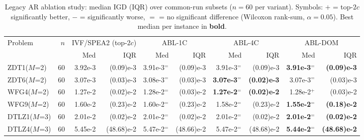 \begin{table}[t]
	\caption{Legacy AR ablation study: median IGD (IQR) over common-run subsets ($n=60$ per variant). Symbols: $+$ = top-$2c$ significantly better, $-$ = significantly worse, $=$ = no significant difference (Wilcoxon rank-sum, $\alpha=0.05$). Best median per instance in \textbf{bold}.}\label{tab:ablation}
	\centering\scriptsize
	\setlength{\tabcolsep}{3pt}
	\begin{tabular}{lrrrrrrrrr}
		\toprule
		Problem      & $n$ & \multicolumn{2}{c}{IVF/SPEA2 (top-$2c$)} & \multicolumn{2}{c}{ABL-1C} & \multicolumn{2}{c}{ABL-4C} & \multicolumn{2}{c}{ABL-DOM}                                                                                              \\
		             &     & Med                                      & IQR                        & Med                        & IQR                         & Med                    & IQR                & Med                    & IQR                 \\
		\midrule
		ZDT1($M$=2)  & 60  & 3.92e-3                                  & (0.09)e-3                  & 3.91e-3$^{=}$              & (0.09)e-3                   & 3.91e-3$^{=}$          & (0.09)e-3          & \textbf{3.91e-3$^{=}$} & \textbf{(0.09)e-3}  \\
		ZDT6($M$=2)  & 60  & 3.07e-3                                  & (0.03)e-3                  & 3.08e-3$^{=}$              & (0.03)e-3                   & \textbf{3.07e-3$^{=}$} & \textbf{(0.02)e-3} & 3.07e-3$^{=}$          & (0.03)e-3           \\
		WFG4($M$=2)  & 60  & 1.27e-2                                  & (0.02)e-2                  & 1.28e-2$^{=}$              & (0.03)e-2                   & \textbf{1.27e-2$^{=}$} & \textbf{(0.02)e-2} & 1.28e-2$^{+}$          & (0.03)e-2           \\
		WFG9($M$=2)  & 60  & 1.60e-2                                  & (0.23)e-2                  & 1.60e-2$^{=}$              & (0.23)e-2                   & 1.58e-2$^{=}$          & (0.23)e-2          & \textbf{1.55e-2$^{=}$} & \textbf{(0.18)e-2}  \\
		DTLZ1($M$=3) & 60  & 2.01e-2                                  & (0.02)e-2                  & 2.01e-2$^{=}$              & (0.02)e-2                   & 2.01e-2$^{=}$          & (0.02)e-2          & \textbf{2.01e-2$^{=}$} & \textbf{(0.02)e-2}  \\
		DTLZ4($M$=3) & 60  & 5.45e-2                                  & (48.68)e-2                 & 5.47e-2$^{=}$              & (48.66)e-2                  & 5.47e-2$^{=}$          & (48.68)e-2         & \textbf{5.44e-2$^{=}$} & \textbf{(48.68)e-2} \\

\end{tabular}
\end{table}
